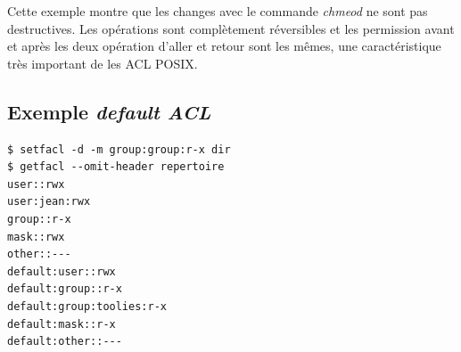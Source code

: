 Cette exemple montre que les changes avec le commande \emph{chmeod} ne sont pas destructives. Les opérations sont complètement réversibles et les permission avant et après les deux opération d'aller et retour sont les mêmes, une caractéristique très important de les ACL POSIX. 


\subsection*{Exemple \emph{default ACL}}


\begin{verbatim}
$ setfacl -d -m group:group:r-x dir 
$ getfacl --omit-header repertoire 
user::rwx
user:jean:rwx
group::r-x 
mask::rwx
other::---
default:user::rwx
default:group::r-x
default:group:toolies:r-x
default:mask::r-x
default:other::---
\end{verbatim} 
